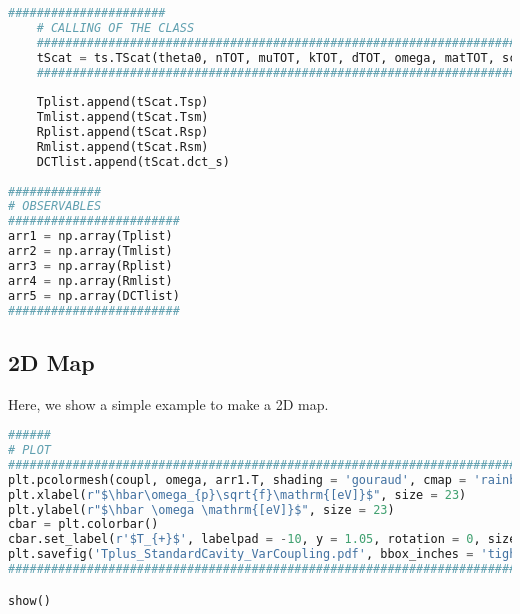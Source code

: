 \documentclass[aps,prl,10pt,onecolumn,superscriptaddress]{revtex4-2}
\begin{document}
\begin{lstlisting}[language=Python, label=multPres, caption=Layers of a preserving FP.]
    ######################
    # CALLING OF THE CLASS 
    #########################################################################
    tScat = ts.TScat(theta0, nTOT, muTOT, kTOT, dTOT, omega, matTOT, scatTOT)  
    #########################################################################
    
    Tplist.append(tScat.Tsp)
    Tmlist.append(tScat.Tsm)
    Rplist.append(tScat.Rsp)
    Rmlist.append(tScat.Rsm)
    DCTlist.append(tScat.dct_s)
    
#############
# OBSERVABLES
########################    
arr1 = np.array(Tplist)
arr2 = np.array(Tmlist)
arr3 = np.array(Rplist)
arr4 = np.array(Rmlist)
arr5 = np.array(DCTlist)
########################
\end{lstlisting}

\subsection{2D Map}
Here, we show a simple example to make a 2D map.
\begin{lstlisting}[language=Python, caption=Plotting part]
######
# PLOT
#############################################################################
plt.pcolormesh(coupl, omega, arr1.T, shading = 'gouraud', cmap = 'rainbow') 
plt.xlabel(r"$\hbar\omega_{p}\sqrt{f}\mathrm{[eV]}$", size = 23)
plt.ylabel(r"$\hbar \omega \mathrm{[eV]}$", size = 23)
cbar = plt.colorbar()
cbar.set_label(r'$T_{+}$', labelpad = -10, y = 1.05, rotation = 0, size = 14)
plt.savefig('Tplus_StandardCavity_VarCoupling.pdf', bbox_inches = 'tight')
#############################################################################

show() 
\end{lstlisting}
\end{document}
